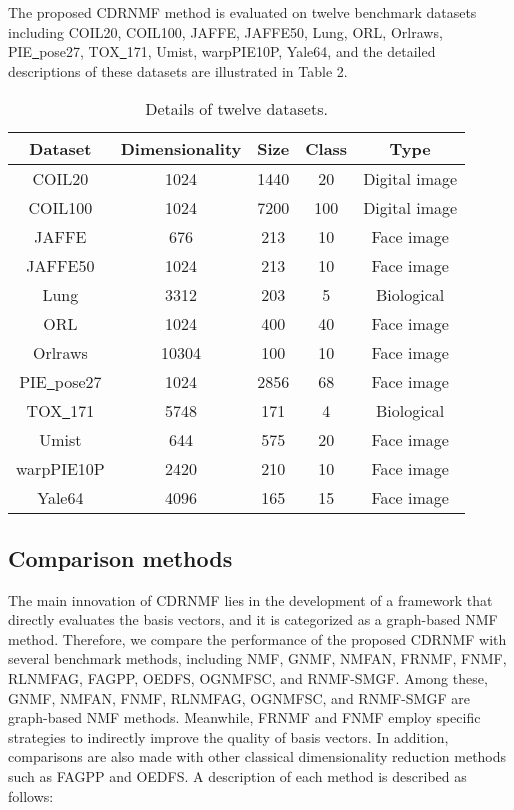 \documentclass[a4paper,fleqn]{cas-sc}
\begin{document}
The proposed CDRNMF method is evaluated on twelve benchmark datasets including COIL20, COIL100, JAFFE, JAFFE50, Lung, ORL, Orlraws, PIE\underline{~}pose27, TOX\underline{~}171, Umist, warpPIE10P, Yale64, \cite{16,24,27,25} and the detailed descriptions of these datasets are illustrated in Table 2.
\begin{table}[h]
	\caption{Details of twelve datasets.}
	\label{tab:4Dataset}
	\centering
	{\footnotesize
	\begin{tabular}{c c c c c}
		\hline
		\textbf{Dataset}&	\textbf{Dimensionality}&	\textbf{Size}&	\textbf{Class}&	\textbf{Type}\\
		\hline
		COIL20&	1024&	1440&	20&	Digital image\\
		COIL100&	1024&	7200&	100&	Digital image\\
		JAFFE&	676&	213&	10&	Face image\\
		JAFFE50&	1024&	213&	10&	Face image\\
		Lung&	3312&	203&	5&	Biological \\
		ORL&	1024&	400&	40&	Face image\\
		Orlraws&	10304&	100&	10&	Face image\\
		PIE\underline{~}pose27&	1024&	2856&	68&	Face image\\
		TOX\underline{~}171&	5748&	171&	4&	Biological\\
		Umist&	644&	575&	20&	Face image\\
		warpPIE10P&	2420&	210&	10&	Face image\\
		Yale64&	4096&	165&	15&	Face image\\
		\hline
	\end{tabular}
}
\end{table}

\subsection{Comparison methods}

The main innovation of CDRNMF lies in the development of a framework that directly evaluates the basis vectors, and it is categorized as a graph-based NMF method. Therefore, we compare the performance of the proposed CDRNMF with several benchmark methods, including NMF, GNMF, NMFAN, FRNMF, FNMF, RLNMFAG, FAGPP, OEDFS, OGNMFSC, and  RNMF-SMGF. Among these, GNMF, NMFAN, FNMF, RLNMFAG, OGNMFSC, and  RNMF-SMGF  are graph-based NMF methods. Meanwhile, FRNMF and FNMF employ specific strategies to indirectly improve the quality of basis vectors. In addition, comparisons are also made with other classical dimensionality reduction methods such as FAGPP and OEDFS.  A description of each method is described as follows:
\end{document}
